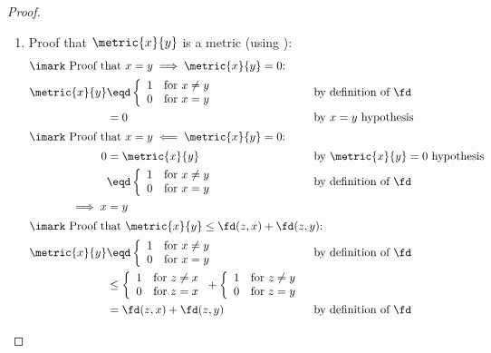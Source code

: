\begin{proof}
\begin{enumerate}
  \item Proof that $\metric{x}{y}$ is a metric (using ):
    \begin{align*}
    \intertext{\imark Proof that $x=y\implies\metric{x}{y}=0$:}
      \metric{x}{y}
        &\eqd \left\{\begin{array}{ll}1 &\text{for } x\ne y \\0&\text{for }x=y \end{array} \right.
        &&    \text{by definition of $\fd$}
      \\&= 0
        && \text{by $x=y$ hypothesis}
      \\
    \intertext{\imark Proof that $x=y\impliedby\metric{x}{y}=0$:}
      0
        &=    \metric{x}{y}
        &&    \text{by $\metric{x}{y}=0$ hypothesis}
      \\&\eqd \left\{\begin{array}{ll}1 &\text{for } x\ne y \\0&\text{for }x=y \end{array} \right.
        &&    \text{by definition of $\fd$}
      \\\implies x&=y
        && \text{}
      \\
    \intertext{\imark Proof that $\metric{x}{y}\le\fd(z,x)+\fd(z,y)$:}
      \metric{x}{y}
        &\eqd \left\{\begin{array}{ll}1 &\text{for } x\ne y \\0&\text{for }x=y \end{array} \right.
        &&    \text{by definition of $\fd$}
      \\&\le  \left\{\begin{array}{ll}1 &\text{for } z\ne x \\0&\text{for }z=x \end{array} \right. +
              \left\{\begin{array}{ll}1 &\text{for } z\ne y \\0&\text{for }z=y \end{array} \right.
      \\&=    \fd(z,x) + \fd(z,y)
        &&    \text{by definition of $\fd$}
    \end{align*}


\end{enumerate}
\end{proof}
